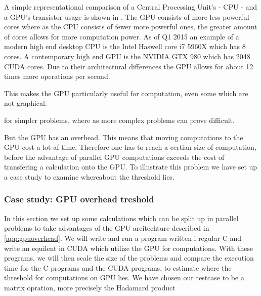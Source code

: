 A simple representational comparison of a Central Processing Unit's - CPU - and a GPU's transistor usage is shown in .
The GPU consists of more less powerful cores where as the CPU consists of fewer more powerful ones, the greater amount of cores allows for more computation power.
As of Q1 2015 an example of a modern high end desktop CPU is the Intel Haswell core i7 5960X which has 8 cores. \citep{puget}
A contemporary high end GPU is the NVIDIA GTX 980 which has 2048 CUDA cores. \citep{techpowerup,gtx980}
Due to their architectural differences the GPU allows for about 12 times more operations per second.

This makes the GPU particularly useful for computation, even some which are not graphical. %


for simpler problems, where as more complex problems can prove difficult.  

But the GPU has an overhead.
This means that moving computations to the GPU cost a lot af time.
Therefore one has to reach a certian size of computation, before the advantage of parallel GPU computations exceeds the cost of transfering a calculation onto the GPU.
To illustrate this problem we have set up a case study to examine whereabout the threshold lies. 

\subsubsection{Case study: GPU overhead treshold}
In this section we set up some calculations which can be split up in parallel problems to take advantages of the GPU arcitechture described in \ref{app:gpuoverhead}.
We will write and run a program written i regular C and write an equilent in CUDA which utilize the GPU for computations.
With these programs, we will then scale the size of the problems and compare the execution time for the C programs and the CUDA programs, to estimate where the threshold for computations on GPU lies.
We have chosen our testcase to be a matrix opration, more precisely the  Hadamard product

